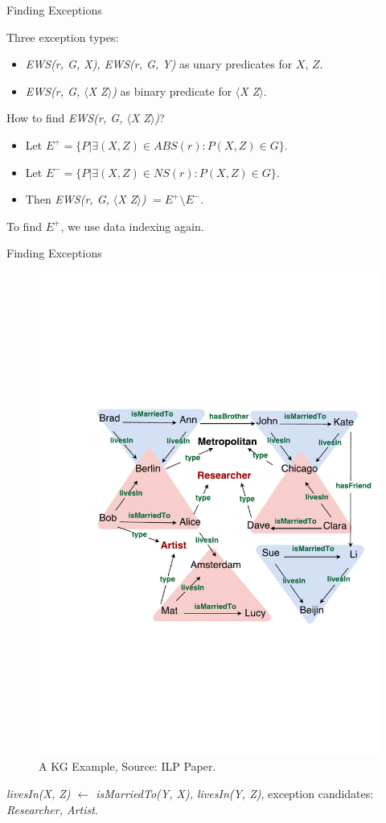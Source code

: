 \documentclass{beamer}
\begin{document}
\begin{frame}{Finding Exceptions}

Three exception types:
\begin{itemize}
	\item \textit{EWS(r, G, X), EWS(r, G, Y)} as unary predicates for $X$, $Z$.
	\item {
		\textit{EWS(r, G, $\langle$X Z$\rangle$)} as binary predicate for \textit{$\langle$X Z$\rangle$}.
		\pause
	}
\end{itemize}

How to find \textit{EWS(r, G, $\langle$X Z$\rangle$)}?
\begin{itemize}
	\item Let $E^+ = \{P | \exists (X, Z) \in ABS(r): P(X, Z) \in G\}$.
	\item Let $E^- = \{P | \exists (X, Z) \in NS(r): P(X, Z) \in G\}$.
	\item Then \textit{EWS(r, G, $\langle$X Z$\rangle$)} $= E^+ \setminus E^-$.
\end{itemize}

To find $E^+$, we use data indexing again.

\end{frame}

\begin{frame}{Finding Exceptions}

\begin{figure}[h]
	\centering
	\includegraphics[page=1,width=.5\textwidth]{example.pdf}
	\caption{A KG Example, Source: ILP Paper.}
\end{figure}

\textit{livesIn(X, Z) $\leftarrow$ isMarriedTo(Y, X), livesIn(Y, Z)}, exception candidates: \textit{Researcher, Artist}.

\end{frame}
\end{document}
